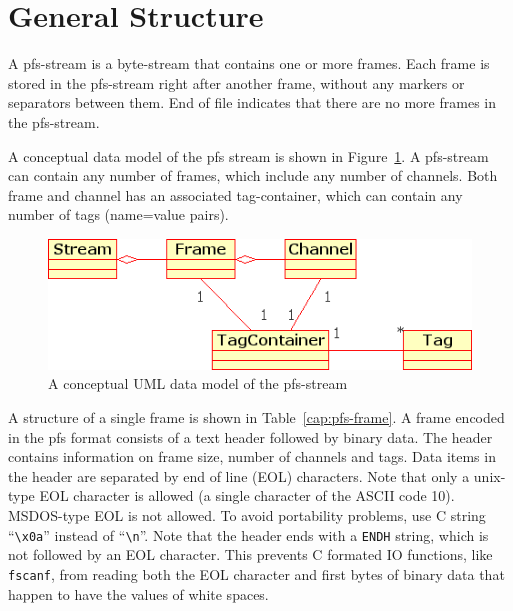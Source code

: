 \documentclass[a4paper,12pt,english]{article}
\begin{document}
\section{General Structure}

A pfs-stream is a byte-stream that contains one or more frames. Each
frame is stored in the pfs-stream right after another frame, without
any markers or separators between them. End of file indicates that
there are no more frames in the pfs-stream.

A conceptual data model of the pfs stream is shown in
Figure~\ref{cap:data-model}. A pfs-stream can contain any number of
frames, which include any number of channels. Both frame and channel
has an associated tag-container, which can contain any number of tags
(name=value pairs).

\begin{figure}
  \centering \includegraphics[width=\textwidth]{data_model.png}
\caption{A conceptual UML data model of the pfs-stream}
\label{cap:data-model}
\end{figure}


A structure of a single frame is shown in Table~\ref{cap:pfs-frame}.
A frame encoded in the pfs format consists of a text header followed
by binary data. The header contains information on frame size, number
of channels and tags. Data items in the header are separated by end of
line (EOL) characters.  Note that only a unix-type EOL character is
allowed (a single character of the ASCII code 10).  MSDOS-type EOL is
not allowed. To avoid portability problems, use C string
``{\tt\textbackslash{}x0a}'' instead of ``{\tt\textbackslash{}n}''.
Note that the header ends with a {\tt ENDH} string, which is not
followed by an EOL character. This prevents C formated IO functions,
like {\tt fscanf}, from reading both the EOL character and first bytes of
binary data that happen to have the values of white spaces.
\end{document}
